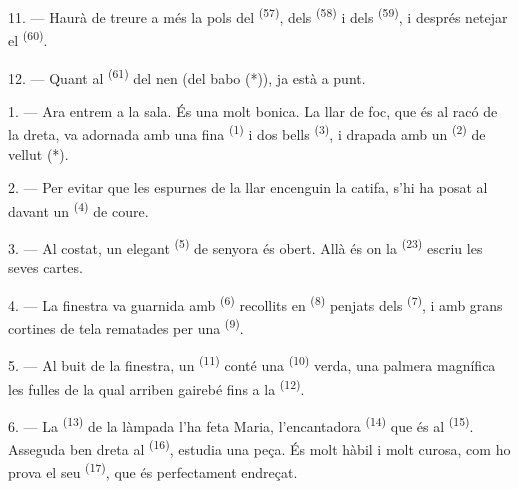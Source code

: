 

11. --- Haurà de treure a més la pols del 
\textsuperscript{(57)}, dels  \textsuperscript{(58)} i dels
 \textsuperscript{(59)}, i després netejar el
 \textsuperscript{(60)}.

12. --- Quant al  \textsuperscript{(61)} del nen (del babo (*)), ja està a
punt.

\VUsaut{5.0mm}
\VUsaut{3.0mm}

1. --- Ara entrem a la sala. És una  molt bonica. La llar de foc, que és al
racó de la dreta, va adornada amb una fina  \textsuperscript{(1)} i dos
bells  \textsuperscript{(3)}, i drapada amb un 
\textsuperscript{(2)} de vellut (*).

2. --- Per evitar que les espurnes de la llar encenguin la catifa, s'hi ha posat al davant un
 \textsuperscript{(4)} de coure.

3. --- Al costat, un elegant  \textsuperscript{(5)} de senyora és obert.
Allà és on la  \textsuperscript{(23)} escriu les seves cartes.

4. --- La finestra va guarnida amb  \textsuperscript{(6)} recollits en
 \textsuperscript{(8)} penjats dels  \textsuperscript{(7)},
i amb grans cortines de tela rematades per una
 \textsuperscript{(9)}.

5. --- Al buit de la finestra, un  \textsuperscript{(11)} conté una
 \textsuperscript{(10)} verda, una palmera magnífica les fulles de
la qual arriben gairebé fins a la  \textsuperscript{(12)}.

6. --- La  \textsuperscript{(13)} de la làmpada l'ha feta Maria,
l'encantadora  \textsuperscript{(14)} que és al 
\textsuperscript{(15)}. Asseguda ben dreta al  \textsuperscript{(16)},
estudia una peça. És molt hàbil i molt curosa, com ho prova el seu 
\textsuperscript{(17)}, que és perfectament endreçat.


